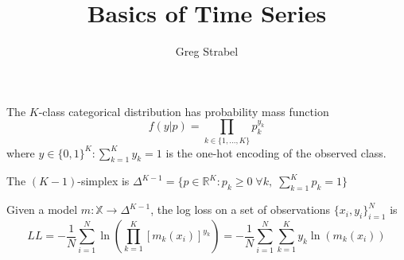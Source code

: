 \documentclass[11pt]{article}
\author{Greg Strabel}
\title{Basics of Time Series}
\begin{document}
The $K$-class categorical distribution has probability mass function
$$f \left( y |  p \right) = \prod_{k \in \{1,...,K \}} p_k^{y_k}$$
where $y \in \{0,1\}^K : \sum_{k=1}^K y_k = 1$ is the one-hot encoding of the observed class.

The $\left( K-1 \right)$-simplex is $\Delta^{K-1} = \{ p \in \mathbb{R}^K : p_k \geq 0 \; \forall k, \; \sum_{k=1}^K p_k = 1 \}$

Given a model $m: \mathbb{X} \rightarrow \Delta^{K-1}$, the log loss on a set of observations $\{x_i,y_i\}_{i=1}^N$ is
$$LL = -\frac{1}{N} \sum_{i=1}^N \ln \left( \prod_{k=1}^K \left[ m_k \left( x_i \right)\right]^{y_k} \right)
= -\frac{1}{N} \sum_{i=1}^N \sum_{k=1}^K y_k \ln \left(   m_k \left( x_i \right) \right)$$
\end{document}

